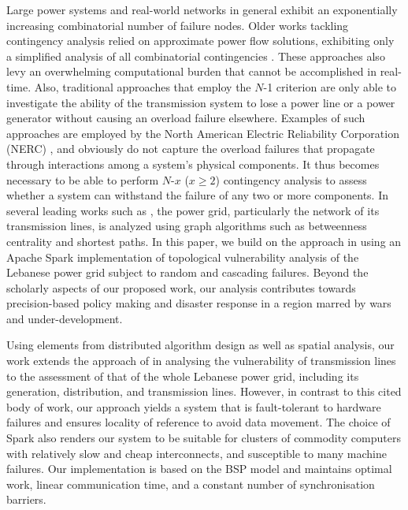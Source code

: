 Large power systems and real-world networks in general exhibit an exponentially increasing combinatorial number of failure nodes. Older works tackling contingency analysis relied on approximate power flow solutions, exhibiting only a simplified analysis of all combinatorial contingencies \cite{EjebeAl79,Ekwue91}. These approaches also levy an overwhelming computational burden that cannot be accomplished in real-time. Also, traditional approaches that employ the $N$-1 criterion are only able to investigate the ability of the transmission system to lose a power line or a power generator without causing an overload failure elsewhere. Examples of such approaches are employed by the North American Electric Reliability Corporation (NERC) \cite{JinAl10}, and obviously do not capture the overload failures that propagate through interactions among a system's physical components. It thus becomes necessary to be able to perform $N$-$x$ ($x \geq2$) contingency analysis to assess whether a system can withstand the failure of any two or more components. In several leading works such as \cite{2000Natur.406..378A,JinAl10, DaqingAl14}, the power grid, particularly the network of its transmission lines, is analyzed using graph algorithms such as betweenness centrality and shortest paths. In this paper, we build on the approach in  \cite{2000Natur.406..378A} using an Apache Spark implementation of topological vulnerability analysis of the Lebanese power grid subject to random  and cascading failures. Beyond the scholarly aspects of our proposed work, our analysis contributes towards precision-based policy making and disaster response in a region marred by wars and under-development. 
 
Using elements from distributed algorithm design as well as spatial analysis, our work extends the approach of \cite{2000Natur.406..378A} in analysing the vulnerability of transmission lines to the assessment of that of the whole Lebanese power grid, including its generation, distribution, and transmission lines. However, in contrast to this cited body of work, our approach yields a system that is fault-tolerant to hardware failures and ensures locality of reference to avoid data movement. The choice of Spark also renders our system to be suitable for clusters of commodity computers with relatively slow and cheap interconnects, and susceptible to many machine failures. Our implementation is based on the BSP model and maintains optimal work, linear communication time, and a constant number of synchronisation barriers. 

